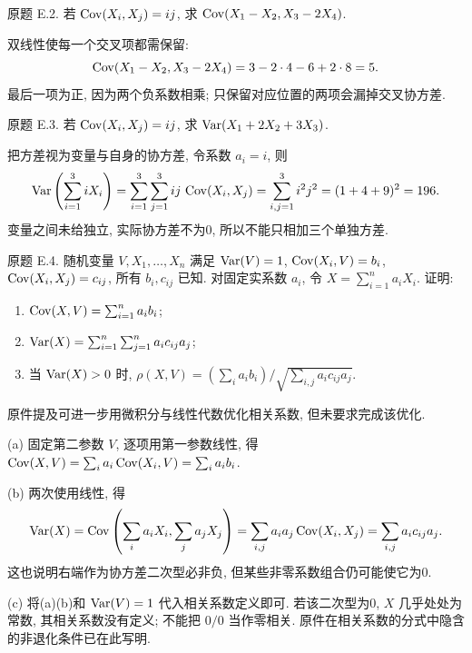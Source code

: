 \begin{exercise}\label{ps4-e2}
原题 E.2. 若 $\operatorname{Cov}(X_i,X_j)=ij$, 求 $\operatorname{Cov}(X_1-X_2,X_3-2X_4)$.
\end{exercise}
\begin{solution}
双线性使每一个交叉项都需保留:
\[
\operatorname{Cov}(X_1-X_2,X_3-2X_4)=3-2\cdot4-6+2\cdot8=5.
\]
最后一项为正, 因为两个负系数相乘; 只保留对应位置的两项会漏掉交叉协方差.
\end{solution}

\begin{exercise}\label{ps4-e3}
原题 E.3. 若 $\operatorname{Cov}(X_i,X_j)=ij$, 求 $\operatorname{Var}(X_1+2X_2+3X_3)$.
\end{exercise}
\begin{solution}
把方差视为变量与自身的协方差, 令系数 $a_i=i$, 则
\[
\operatorname{Var}\left(\sum_{i=1}^3iX_i\right)
=\sum_{i=1}^3\sum_{j=1}^3 ij\,\operatorname{Cov}(X_i,X_j)
=\sum_{i,j=1}^3 i^2j^2=(1+4+9)^2=196.
\]
变量之间未给独立, 实际协方差不为0, 所以不能只相加三个单独方差.
\end{solution}

\begin{exercise}\label{ps4-e4}
原题 E.4. 随机变量 $V,X_1,\ldots,X_n$ 满足 $\operatorname{Var}(V)=1$, $\operatorname{Cov}(X_i,V)=b_i$, $\operatorname{Cov}(X_i,X_j)=c_{ij}$, 所有 $b_i,c_{ij}$ 已知. 对固定实系数 $a_i$, 令 $X=\sum_{i=1}^n a_iX_i$. 证明:
\begin{enumerate}[label=(\alph*)]
\item $\operatorname{Cov}(X,V)=\sum_{i=1}^na_ib_i$;
\item $\operatorname{Var}(X)=\sum_{i=1}^n\sum_{j=1}^na_ic_{ij}a_j$;
\item 当 $\operatorname{Var}(X)>0$ 时, $\rho(X,V)=(\sum_i a_ib_i)/\sqrt{\sum_{i,j}a_ic_{ij}a_j}$.
\end{enumerate}
原件提及可进一步用微积分与线性代数优化相关系数, 但未要求完成该优化.
\end{exercise}
\begin{solution}
(a) 固定第二参数 $V$, 逐项用第一参数线性, 得
$\operatorname{Cov}(X,V)=\sum_i a_i\operatorname{Cov}(X_i,V)=\sum_i a_ib_i$.

(b) 两次使用线性, 得
\[
\operatorname{Var}(X)=\operatorname{Cov}\left(\sum_i a_iX_i,\sum_j a_jX_j\right)
=\sum_{i,j}a_i a_j\operatorname{Cov}(X_i,X_j)=\sum_{i,j}a_ic_{ij}a_j.
\]
这也说明右端作为协方差二次型必非负, 但某些非零系数组合仍可能使它为0.

(c) 将(a)(b)和 $\operatorname{Var}(V)=1$ 代入相关系数定义即可. 若该二次型为0, $X$ 几乎处处为常数, 其相关系数没有定义; 不能把 $0/0$ 当作零相关. 原件在相关系数的分式中隐含的非退化条件已在此写明.
\end{solution}

